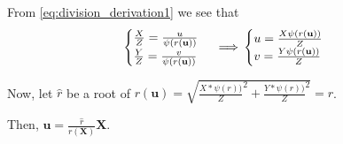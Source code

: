From \ref{eq:division_derivation1} we see that
\begin{equation} \label{eq:division_derivation2}
	\begin{cases}
		\frac{X}{Z} = \frac{u}{\psi(r(\mathbf{u}))} \\
		\frac{Y}{Z} = \frac{v}{\psi(r(\mathbf{u}))}
	\end{cases} \implies \\
	\begin{cases}
		u = \frac{X \psi(r(\mathbf{u}))}{Z} \\
		v = \frac{Y \psi(r(\mathbf{u}))}{Z}
	\end{cases}
\end{equation}

Now, let \(\widehat{r}\) be a root of
\(r(\mathbf{u})
= \sqrt{
	\frac{X * \psi \left( r\right))}{Z}^{2} +
	\frac{Y * \psi \left( r\right))}{Z}^{2}
} = r\).

Then, \(\mathbf{u} = \frac{\widehat{r}}{r(\mathbf{X})}\mathbf{X}\).




